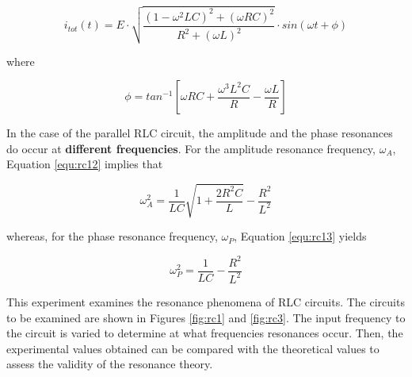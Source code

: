 \begin{equation}
i_{tot}(t)=E\cdot\sqrt{\dfrac{(1-\omega^2LC)^2+(\omega RC)^2}{R^2+(\omega L)^2}}\cdot sin(\omega t+\phi)
\label{equ:rc12}
\end{equation}

\noindent where

\begin{equation}
\phi=tan^{-1}\left[\omega RC+\dfrac{\omega^3L^2C}{R}-\dfrac{\omega L}{R}\right]
\label{equ:rc13}
\end{equation}

In the case of the parallel RLC circuit, the amplitude and the phase resonances do occur at {\bf different frequencies}. For the amplitude resonance frequency, $\omega_A$, Equation \ref{equ:rc12} implies that

\begin{equation}
\omega_A^2=\dfrac{1}{LC}\sqrt{1+\dfrac{2R^2C}{L}}-\dfrac{R^2}{L^2}
\label{equ:rc14}
\end{equation}

\noindent whereas, for the phase resonance frequency, $\omega_P$, Equation \ref{equ:rc13} yields

\begin{equation}
\omega_P^2=\dfrac{1}{LC}-\dfrac{R^2}{L^2}
\label{equ:rc15}
\end{equation}

This experiment examines the resonance phenomena of RLC circuits. The circuits to be examined are shown in Figures \ref{fig:rc1} and \ref{fig:rc3}. The input frequency to the circuit is varied to determine at what frequencies resonances occur. Then, the experimental values obtained can be compared with the theoretical values to assess the validity of the resonance theory.


